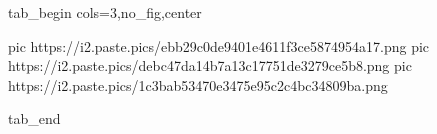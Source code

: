  
 
 
 
 


\ifcmt
  tab_begin cols=3,no_fig,center

     pic https://i2.paste.pics/ebb29c0de9401e4611f3ce5874954a17.png
		 pic https://i2.paste.pics/debc47da14b7a13c17751de3279ce5b8.png
		 pic https://i2.paste.pics/1c3bab53470e3475e95c2c4bc34809ba.png

  tab_end
\fi
